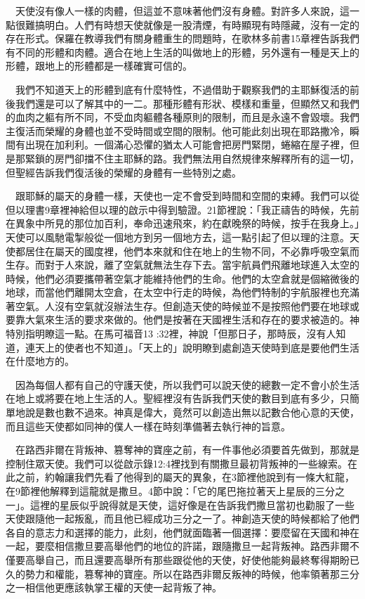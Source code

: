 \documentclass{book}
\begin{document}
　天使沒有像人一樣的肉體，但這並不意味著他們沒有身體。對許多人來說，這一點很難搞明白。人們有時想天使就像是一股清煙，有時顯現有時隱藏，沒有一定的存在形式。保羅在教導我們有關身體重生的問題時，在歌林多前書15章裡告訴我們有不同的形體和肉體。適合在地上生活的叫做地上的形體，另外還有一種是天上的形體，跟地上的形體都是一樣確實可信的。

　我們不知道天上的形體到底有什麼特性，不過借助于觀察我們的主耶穌復活的前後我們還是可以了解其中的一二。那種形體有形狀、模樣和重量，但顯然又和我們的血肉之軀有所不同，不受血肉軀體各種原則的限制，而且是永遠不會毀壞。我們主復活而榮耀的身體也並不受時間或空間的限制。他可能此刻出現在耶路撒冷，瞬間有出現在加利利。一個滿心恐懼的猶太人可能會把房門緊閉，蜷縮在屋子裡，但是那緊鎖的房門卻擋不住主耶穌的路。我們無法用自然規律來解釋所有的這一切，但聖經告訴我們復活後的榮耀的身體有一些特別之處。

　跟耶穌的屬天的身體一樣，天使也一定不會受到時間和空間的束縛。我們可以從但以理書9章裡神給但以理的啟示中得到驗證。21節裡說：「我正禱告的時候，先前在異象中所見的那位加百利，奉命迅速飛來，約在獻晚祭的時候，按手在我身上。」天使可以風馳電掣般從一個地方到另一個地方去，這一點引起了但以理的注意。天使都居住在屬天的國度裡，他們本來就和住在地上的生物不同，不必靠呼吸空氣而生存。而對于人來說，離了空氣就無法生存下去。當宇航員們飛離地球進入太空的時候，他們必須要攜帶著空氣才能維持他們的生命。他們的太空倉就是個縮微後的地球，而當他們離開太空倉，在太空中行走的時候，為他們特制的宇航服裡也充滿著空氣。人沒有空氣就沒辦法生存。但創造天使的時候並不是按照他們要在地球或要靠大氣來生活的要求來做的。他們是按著在天國裡生活和存在的要求被造的。神特別指明瞭這一點。在馬可福音13 :32裡，神說「但那日子，那時辰，沒有人知道，連天上的使者也不知道」。「天上的」說明瞭到處創造天使時到底是要他們生活在什麼地方的。

　因為每個人都有自己的守護天使，所以我們可以說天使的總數一定不會小於生活在地上或將要在地上生活的人。聖經裡沒有告訴我們天使的數目到底有多少，只簡單地說是數也數不過來。神真是偉大，竟然可以創造出無以記數合他心意的天使，而且這些天使都如同神的僕人一樣在時刻準備著去執行神的旨意。

　在路西非爾在背叛神、篡奪神的寶座之前，有一件事他必須要首先做到，那就是控制住眾天使。我們可以從啟示錄12:4裡找到有關撒旦最初背叛神的一些線索。在此之前，約翰讓我們先看了他得到的屬天的異象，在3節裡他說到有一條大紅龍，在9節裡他解釋到這龍就是撒旦。4節中說：「它的尾巴拖拉著天上星辰的三分之一」。這裡的星辰似乎說得就是天使，這好像是在告訴我們撒旦當初也勸服了一些天使跟隨他一起叛亂，而且他已經成功三分之一了。神創造天使的時候都給了他們各自的意志力和選擇的能力，此刻，他們就面臨著一個選擇：要麼留在天國和神在一起，要麼相信撒旦要高舉他們的地位的許諾，跟隨撒旦一起背叛神。路西非爾不僅要高舉自己，而且還要高舉所有那些跟從他的天使，好使他能夠最終奪得期盼已久的勢力和權能，篡奪神的寶座。所以在路西非爾反叛神的時候，他率領著那三分之一相信他更應該執掌王權的天使一起背叛了神。
\end{document}
